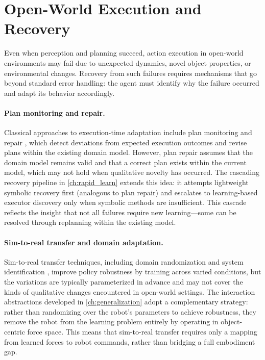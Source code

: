 \section{Open-World Execution and Recovery}
\label{sec:rw_execution}

Even when perception and planning succeed, action execution in open-world environments may fail due to unexpected dynamics, novel object properties, or environmental changes. Recovery from such failures requires mechanisms that go beyond standard error handling: the agent must identify why the failure occurred and adapt its behavior accordingly.

\paragraph{Plan monitoring and repair.}
Classical approaches to execution-time adaptation include plan monitoring and repair \citep{fox2006plan, fritz2007monitoring}, which detect deviations from expected execution outcomes and revise plans within the existing domain model. However, plan repair assumes that the domain model remains valid and that a correct plan exists within the current model, which may not hold when qualitative novelty has occurred. The cascading recovery pipeline in \cref{ch:rapid_learn} extends this idea: it attempts lightweight symbolic recovery first (analogous to plan repair) and escalates to learning-based executor discovery only when symbolic methods are insufficient. This cascade reflects the insight that not all failures require new learning---some can be resolved through replanning within the existing model.

\paragraph{Sim-to-real transfer and domain adaptation.}
Sim-to-real transfer techniques, including domain randomization \citep{tobin2017domain} and system identification \citep{peng2018sim}, improve policy robustness by training across varied conditions, but the variations are typically parameterized in advance and may not cover the kinds of qualitative changes encountered in open-world settings. The interaction abstractions developed in \cref{ch:generalization} adopt a complementary strategy: rather than randomizing over the robot's parameters to achieve robustness, they remove the robot from the learning problem entirely by operating in object-centric force space. This means that sim-to-real transfer requires only a mapping from learned forces to robot commands, rather than bridging a full embodiment gap.


